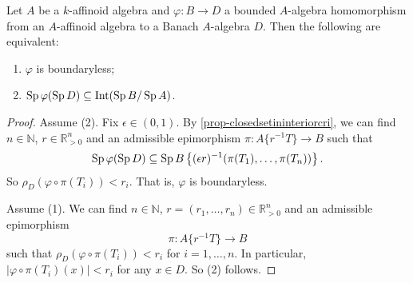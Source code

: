 \begin{proposition}
    Let $A$ be a $k$-affinoid algebra and $\varphi:B\rightarrow D$ a bounded $A$-algebra homomorphism from an $A$-affinoid algebra to a Banach $A$-algebra $D$. Then the following are equivalent:
    \begin{enumerate}
        \item $\varphi$ is boundaryless;
        \item $\operatorname{Sp} \varphi(\operatorname{Sp} D)\subseteq \operatorname{Int}(\operatorname{Sp} B/\operatorname{Sp} A)$.
    \end{enumerate}
\end{proposition}
\begin{proof}
    Assume (2). Fix $\epsilon\in (0,1)$. By \cref{prop-closedsetininteriorcri}, we can find $n\in \mathbb{N}$, $r\in \mathbb{R}^n_{>0}$ and an admissible epimorphism $\pi: A\{r^{-1}T\}\rightarrow B$ such that 
    \[
        \operatorname{Sp} \varphi(\operatorname{Sp} D)\subseteq \operatorname{Sp} B\left\{(\epsilon r)^{-1}(\pi(T_1),\ldots,\pi(T_n))\right\}.    
    \]
    So $\rho_D(\varphi\circ \pi(T_i))<r_i$. That is, $\varphi$ is boundaryless.

    Assume (1). We can find $n\in \mathbb{N}$, $r=(r_1,\ldots,r_n)\in \mathbb{R}^n_{>0}$ and an admissible epimorphism
    \[
        \pi: A\{r^{-1}T\}\rightarrow B    
    \] 
    such that $\rho_D(\varphi\circ \pi(T_i))<r_i$ for $i=1,\ldots,n$. In particular, $|\varphi\circ\pi(T_i)(x)|<r_i$ for any $x\in D$. So (2) follows. 
\end{proof}

\printbibliography
